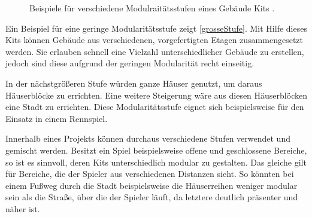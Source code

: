\begin{figure}[!h]
\label{StufenBilder}
\centering
  \qquad
  \caption{Beispiele für verschiedene Modulraitätsstufen eines Gebäude Kits \parencite{Perry}.}%
\end{figure}
Ein Beispiel für eine geringe Modularitätsstufe zeigt \ref{grosseStufe}. Mit Hilfe dieses Kits können Gebäude aus verschiedenen, vorgefertigten Etagen zusammengesetzt werden. Sie erlauben schnell eine Vielzahl unterschiedlicher Gebäude zu erstellen, jedoch sind diese aufgrund der geringen Modularität recht einseitig.
\par
In der nächstgrößeren Stufe würden ganze Häuser genutzt, um daraus Häuserblöcke zu errichten. Eine weitere Steigerung wäre aus diesen Häuserblöcken eine Stadt zu errichten. Diese Modularitätsstufe eignet sich beispielsweise für den Einsatz in einem Rennspiel. \parencite{Perry}
\par
Innerhalb eines Projekts können durchaus verschiedene Stufen verwendet und gemischt werden. Besitzt ein Spiel beispielsweise offene und geschlossene Bereiche, so ist es sinnvoll, deren Kits unterschiedlich modular zu gestalten. Das gleiche gilt für Bereiche, die der Spieler aus verschiedenen Distanzen sieht. So könnten bei einem Fußweg durch die Stadt beispielsweise die Häuserreihen weniger modular sein als die Straße, über die der Spieler läuft, da letztere deutlich präsenter und näher ist. \parencite{Klafke}
